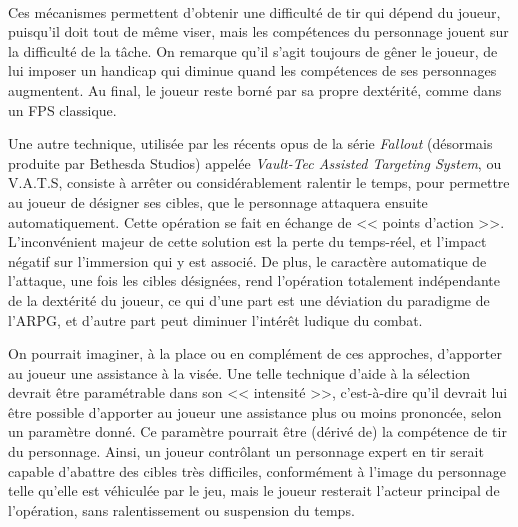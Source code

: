 	\paragraph{}
	Ces mécanismes permettent d'obtenir une difficulté de tir qui dépend du joueur, puisqu'il doit tout de même viser, mais les compétences du personnage jouent sur la difficulté de la tâche. On remarque qu'il s'agit toujours de gêner le joueur, de lui imposer un handicap qui diminue quand les compétences de ses personnages augmentent. Au final, le joueur reste borné par sa propre dextérité, comme dans un FPS classique.
	
	Une autre technique, utilisée par les récents opus de la série \emph{Fallout} (désormais produite par Bethesda Studios) appelée \emph{Vault-Tec Assisted Targeting System}, ou V.A.T.S, consiste à arrêter ou considérablement ralentir le temps, pour permettre au joueur de désigner ses cibles, que le personnage attaquera ensuite automatiquement. Cette opération se fait en échange de << points d'action >>. L'inconvénient majeur de cette solution est la perte du temps-réel, et l'impact négatif sur l'immersion qui y est associé. De plus, le caractère automatique de l'attaque, une fois les cibles désignées, rend l'opération totalement indépendante de la dextérité du joueur, ce qui d'une part est une déviation du paradigme de l'ARPG, et d'autre part peut diminuer l'intérêt ludique du combat.
	
	On pourrait imaginer, à la place ou en complément de ces approches, d'apporter au joueur une assistance à la visée. Une telle technique d'aide à la sélection devrait être paramétrable dans son << intensité >>, c'est-à-dire qu'il devrait lui être possible d'apporter au joueur une assistance plus ou moins prononcée, selon un paramètre donné. Ce paramètre pourrait être (dérivé de) la compétence de tir du personnage. Ainsi, un joueur contrôlant un personnage expert en tir serait capable d'abattre des cibles très difficiles, conformément à l'image du personnage telle qu'elle est véhiculée par le jeu, mais le joueur resterait l'acteur principal de l'opération, sans ralentissement ou suspension du temps.
	

